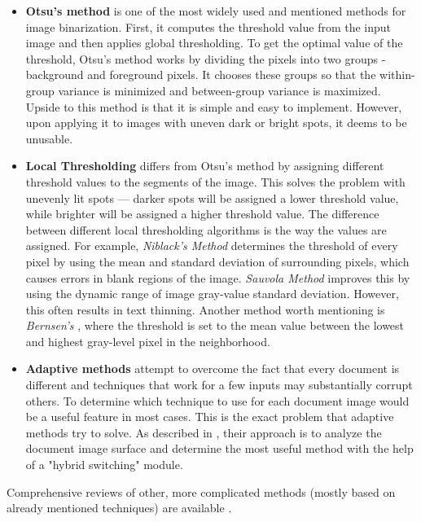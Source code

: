 \begin{itemize}
\item\textbf{Otsu's method} \citep{otsu} is one of the most widely used and mentioned methods for image binarization. First, it computes the threshold value from the input image and then applies global thresholding. To get the optimal value of the threshold, Otsu's method works by dividing the pixels into two groups - background and foreground pixels. It chooses these groups so that the within-group variance is minimized and between-group variance is maximized. Upside to this method is that it is simple and easy to implement. However, upon applying it to images with uneven dark or bright spots, it deems to be unusable.

\item\textbf{Local Thresholding} \citep{localOtherBin} differs from Otsu's method by assigning different threshold values to the segments of the image. This solves the problem with unevenly lit spots --- darker spots will be assigned a lower threshold value, while brighter will be assigned a higher threshold value. The difference between different local thresholding algorithms is the way the values are assigned. For example, \emph{Niblack's Method} \citep{adaptiveBin} determines the threshold of every pixel by using the mean and standard deviation of surrounding pixels, which causes errors in blank regions of the image. \emph{Sauvola Method} \citep{adaptiveBin} improves this by using the dynamic range of image gray-value standard deviation. However, this often results in text thinning. Another method worth mentioning is \emph{Bernsen's} \citep{adaptiveBin}, where the threshold is set to the mean value between the lowest and highest gray-level pixel in the neighborhood.

\item\textbf{Adaptive methods} attempt to overcome the fact that every document is different and techniques that work for a few inputs may substantially corrupt others. To determine which technique to use for each document image would be a useful feature in most cases. This is the exact problem that adaptive methods try to solve. As described in \citep{adaptiveBin}, their approach is to analyze the document image surface and determine the most useful method with the help of a "hybrid switching" module.

\end{itemize}

Comprehensive reviews of other, more complicated methods (mostly based on already mentioned techniques) are available \citet{localOtherBin}.

